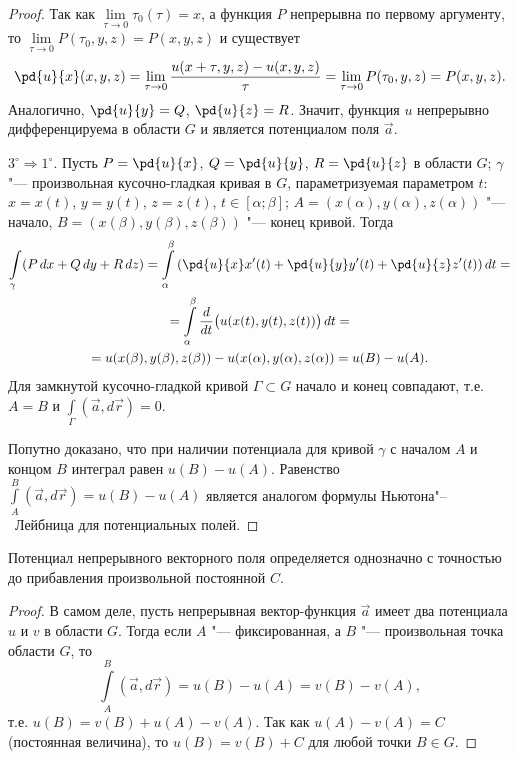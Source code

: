 \begin{proof}
Так как $\lim\limits_{\tau \to 0} \tau_0(\tau) = x$, а функция $P$ непрерывна по первому аргументу, то $\lim\limits_{\tau \to 0} P(\tau_0, y, z) = P(x, y, z)$ и существует
$$
\pd{u}{x}(x, y, z) = \lim\limits_{\tau \to 0} \frac{u(x + \tau, y, z) - u(x, y, z)}{\tau} = \lim\limits_{\tau \to 0} P(\tau_0, y, z) = P(x, y, z).
$$
Аналогично, $\pd{u}{y} = Q$, $\pd{u}{z} = R$. Значит, функция $u$ непрерывно дифференцируема в области $G$ и является потенциалом поля $\vec{a}$.

$3^\circ \Rightarrow 1^\circ$. Пусть $P = \pd{u}{x}$, $Q = \pd{u}{y}$, $R = \pd{u}{z}$ в области $G$; $\gamma$ "--- произвольная кусочно-гладкая кривая в $G$, параметризуемая параметром $t$: $x = x(t)$, $y = y(t)$, $z = z(t)$, $t \in [\alpha; \beta]$; $A = (x(\alpha), y(\alpha), z(\alpha))$ "--- начало, $B = (x(\beta), y(\beta), z(\beta))$ "--- конец кривой. Тогда
\begin{multline*}
\int\limits_\gamma (P\,dx + Q\,dy + R\,dz) = \int\limits_\alpha^\beta \left( \pd{u}{x} x'(t) + \pd{u}{y} y'(t) + \pd{u}{z} z'(t) \right) dt = \\
= \int\limits_\alpha^\beta \frac{d}{dt}\bigl( u(x(t), y(t), z(t)) \bigr)\,dt = \\
= u(x(\beta), y(\beta), z(\beta)) - u(x(\alpha), y(\alpha), z(\alpha)) = u(B) - u(A).
\end{multline*}
Для замкнутой кусочно-гладкой кривой $\Gamma \subset G$ начало и конец совпадают, т.е. $A = B$ и $\int\limits_\Gamma (\vec{a}, d\vec{r}) = 0$.

Попутно доказано, что при наличии потенциала для кривой $\gamma$ с началом $A$ и концом $B$ интеграл равен $u(B) - u(A)$. Равенство $\int\limits_A^B (\vec{a}, d\vec{r}) = u(B) - u(A)$ является аналогом формулы Ньютона"--~Лейбница для потенциальных полей.
\end{proof}

\begin{notion}
Потенциал непрерывного векторного поля определяется однозначно с точностью до прибавления произвольной постоянной $C$.
\end{notion}

\begin{proof}
В самом деле, пусть непрерывная вектор-функция $\vec{a}$ имеет два потенциала $u$ и $v$ в области $G$. Тогда если $A$ "--- фиксированная, а $B$ "--- произвольная точка области $G$, то
$$
\int\limits_A^B (\vec{a}, d\vec{r}) = u(B) - u(A) = v(B) - v(A),
$$
т.е. $u(B) = v(B) + u(A) - v(A)$. Так как $u(A) - v(A) = C$ (постоянная величина), то $u(B) = v(B) + C$ для любой точки $B \in G$.
\end{proof}